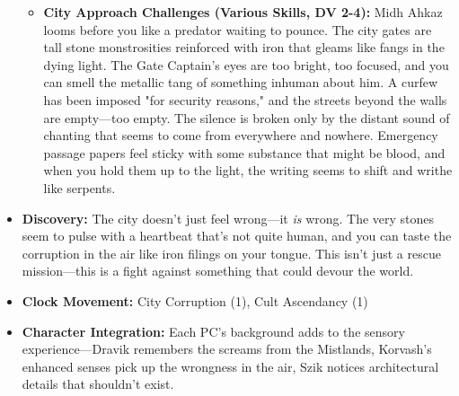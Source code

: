 \documentclass[11pt]{article}
\begin{document}
\begin{itemize}
\begin{itemize}
  \item \textbf{City Approach Challenges (Various Skills, DV 2-4):} Midh Ahkaz looms before you like a predator waiting to pounce. The city gates are tall stone monstrosities reinforced with iron that gleams like fangs in the dying light. The Gate Captain's eyes are too bright, too focused, and you can smell the metallic tang of something inhuman about him. A curfew has been imposed "for security reasons," and the streets beyond the walls are empty—too empty. The silence is broken only by the distant sound of chanting that seems to come from everywhere and nowhere. Emergency passage papers feel sticky with some substance that might be blood, and when you hold them up to the light, the writing seems to shift and writhe like serpents.
  \end{itemize}
\item \textbf{Discovery:} The city doesn't just feel wrong—it \textit{is} wrong. The very stones seem to pulse with a heartbeat that's not quite human, and you can taste the corruption in the air like iron filings on your tongue. This isn't just a rescue mission—this is a fight against something that could devour the world.
\item \textbf{Clock Movement:} City Corruption (1), Cult Ascendancy (1)
\item \textbf{Character Integration:} Each PC's background adds to the sensory experience—Dravik remembers the screams from the Mistlands, Korvash's enhanced senses pick up the wrongness in the air, Szik notices architectural details that shouldn't exist.
\end{itemize}
\end{document}
